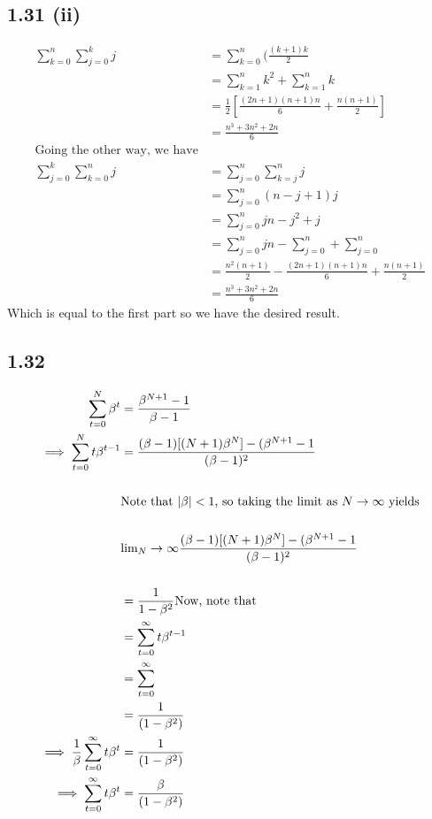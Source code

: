 \documentclass[letterpaper,12pt]{article}
\theoremstyle{definition}
\begin{document}
\subsection*{1.31 (ii)}
\begin{align*}
\sum^{n}_{k=0}  \sum^{k}_{j = 0} j &= \sum^{n}_{k = 0} (\frac{(k+1)k}{2}
\\&= \sum^{n}_{k=1} k^2 + \sum^{n}_{k=1} k
\\&= \frac{1}{2}[\frac{(2n+1)(n+1)n}{6} + \frac{n(n+1)}{2}]
\\&= \frac{n^3 + 3n^2 + 2n}{6} 
\\
\text{Going the other way, we have}\\
\sum^{k}_{j=0} \sum^{n}_{k=0}j &= \sum^{n}_{j = 0} \sum^{n}_{k = j} j
\\&= \sum^{n}_{j=0} (n-j+1)j
\\&= \sum^{n}_{j = 0} jn - j^2 + j
\\&= \sum^{n}_{j = 0} jn - \sum^{n}_{j=0} + \sum^{n}_{j = 0} 
\\&= \frac{n^2(n+1)}{2} - \frac{(2n+1)(n+1)n}{6} + \frac{n(n+1)}{2}
\\&= \frac{n^3 + 3n^2 + 2n}{6}
\end{align*}
Which is equal to the first part so we have the desired result.

\subsection*{1.32}
\begin{align*}
\sum^{N}_{t= 0 } \beta^t &= \frac{\beta^{N+1}-1}{\beta-1}
\\\implies \sum^{N}_{t=0} t\beta^{t-1} &= \frac{(\beta-1)[(N+1)\beta^N] - (\beta^{N+1} -1}{(\beta-1)^2}\\
\\
&\text{Note that $ \vert \beta \vert < 1$, so taking the limit as $N \rightarrow \infty$ yields}
\\
\\ &\text{lim}_N\rightarrow\infty \frac{(\beta-1)[(N+1)\beta^N] - (\beta^{N+1} -1}{(\beta-1)^2}\\
\\&= \frac{1}{1-\beta^2}
\text{Now, note that}
\\&= \sum^{\infty}_{t=0} t\beta^{t-1} 
\\&= \sum^{\infty}_{t=0} 
\\&= \frac{1}{(1-\beta^2)}
\\
\implies \frac{1}{\beta} \sum^{\infty}_{t = 0} t \beta^t &= \frac{1}{(1-\beta^2)}\\
\implies \sum^{\infty}_{t = 0} t \beta^t &= \frac{\beta}{(1-\beta^2)}
\end{align*}
\end{document}
